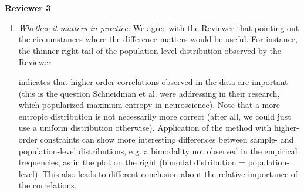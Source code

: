 \documentclass{article}
\begin{document}
\textbf{Reviewer 3}
\begin{enumerate}[wide]
\item \emph{Whether it matters in practice:} We agree with the Reviewer
  that pointing out the circumstances where the difference matters would be
  useful. For instance, the thinner
  right tail of the population-level distribution observed by the Reviewer\\
  \begin{minipage}[t]{0.74\linewidth}indicates that higher-order
    correlations observed in the data are important (this is the question
    Schneidman et al. were addressing in their research, which popularized
    maximum-entropy in neuroscience). Note that a more entropic
    distribution is not necessarily more correct (after all, we could just
    use a uniform distribution otherwise). Application of the method with
    higher-order constraints can show more interesting differences between
    sample- and population-level distributions, e.g. a bimodality not
    observed in the empirical frequencies, as in the plot on the right
    (bimodal distribution = population-level). This also leads to different
    conclusion about the relative importance of the correlations.
  \end{minipage}
  \hspace{\fill}


\end{enumerate}
\end{document}
